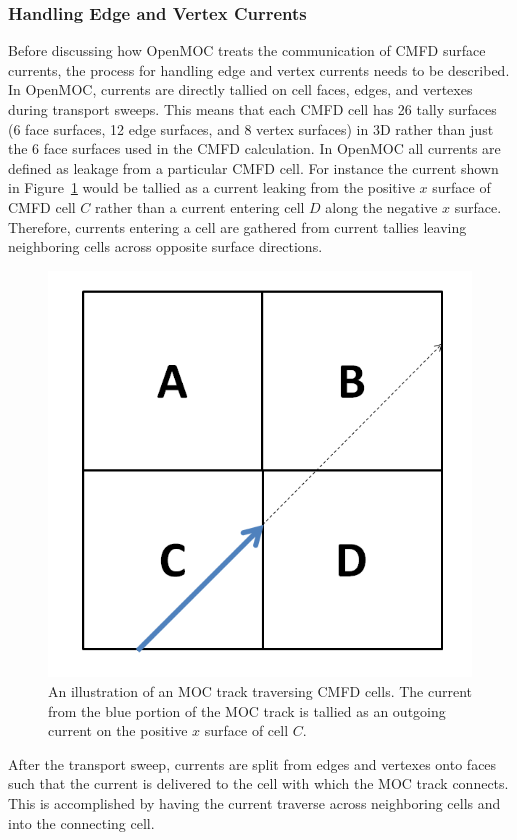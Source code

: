 \subsubsection{Handling Edge and Vertex Currents}

Before discussing how OpenMOC treats the communication of \ac{CMFD} surface currents, the process for handling edge and vertex currents needs to be described. In OpenMOC, currents are directly tallied on cell faces, edges, and vertexes during transport sweeps. This means that each \ac{CMFD} cell has 26 tally surfaces (6 face surfaces, 12 edge surfaces, and 8 vertex surfaces) in 3D rather than just the 6 face surfaces used in the \ac{CMFD} calculation. In OpenMOC all currents are defined as leakage from a particular \ac{CMFD} cell. For instance the current shown in Figure~\ref{fig:tally-current} would be tallied as a current leaking from the positive $x$ surface of \ac{CMFD} cell $C$ rather than a current entering cell $D$ along the negative $x$ surface. Therefore, currents entering a cell are gathered from current tallies leaving neighboring cells across opposite surface directions.


\begin{figure}[h!]
	\centering
	\includegraphics[width=0.6\linewidth]{figures/DD/current-transfer.PNG}
	\caption[]{An illustration of an \ac{MOC} track traversing \ac{CMFD} cells. The current from the blue portion of the \ac{MOC} track is tallied as an outgoing current on the positive $x$ surface of cell $C$.}
	\label{fig:tally-current}
\end{figure}

After the transport sweep, currents are split from edges and vertexes onto faces such that the current is delivered to the cell with which the \ac{MOC} track connects. This is accomplished by having the current traverse across neighboring cells and into the connecting cell.

